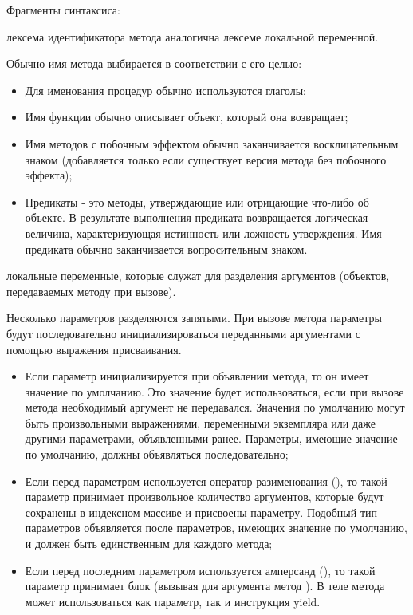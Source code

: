 \begin{keylist}{Фрагменты синтаксиса:}
  
   лексема идентификатора метода аналогична лексеме локальной переменной.

  Обычно имя метода выбирается в соответствии с его целью:
  \begin{itemize}
    \item Для именования процедур обычно используются глаголы;
    \item Имя функции обычно описывает объект, который она возвращает;
    \item Имя методов с побочным эффектом обычно заканчивается восклицательным знаком (добавляется только если существует версия метода без побочного эффекта);
    \item Предикаты - это методы, утверждающие или отрицающие что-либо об объекте. В результате выполнения предиката возвращается логическая величина, характеризующая истинность или ложность утверждения. Имя предиката обычно заканчивается вопросительным знаком.
  \end{itemize}
  
   локальные переменные, которые служат для разделения аргументов (объектов, передаваемых методу при вызове).

  Несколько параметров разделяются запятыми. При вызове метода параметры будут последовательно инициализироваться переданными аргументами с помощью выражения присваивания.
  \begin{itemize}
    \item Если параметр инициализируется при объявлении метода, то он имеет значение по умолчанию. Это значение будет использоваться, если при вызове метода необходимый аргумент не передавался. Значения по умолчанию могут быть произвольными выражениями, переменными экземпляра или даже другими параметрами, объявленными ранее. Параметры, имеющие значение по умолчанию, должны объявляться последовательно;

    \item Если перед параметром используется оператор разименования (\mono{*}), то такой параметр принимает произвольное количество аргументов, которые будут сохранены в индексном массиве и присвоены параметру. Подобный тип параметров объявляется после параметров, имеющих значение по умолчанию, и должен быть единственным для каждого метода;

    \item Если перед последним параметром используется амперсанд (\mono{\&}), то такой параметр принимает блок (вызывая для аргумента метод ). В теле метода может использоваться как параметр, так и инструкция yield.
  \end{itemize}


\end{keylist}

